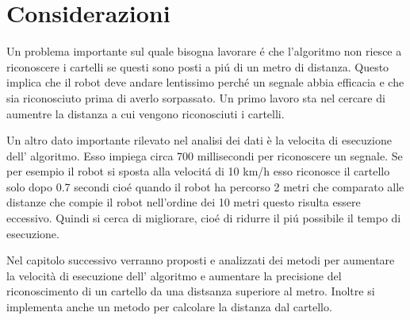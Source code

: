 \section{Considerazioni}

	Un problema importante sul quale bisogna lavorare \'e che l'algoritmo non riesce a riconoscere i cartelli se questi sono posti a pi\'u di un metro di distanza. Questo implica che il robot deve andare lentissimo perch\'e un segnale abbia efficacia e che sia riconosciuto prima di averlo sorpassato. Un primo lavoro sta nel cercare di aumentre la distanza a cui vengono riconosciuti i cartelli.

	Un altro dato importante rilevato nel analisi dei dati è la velocita di esecuzione dell' algoritmo. Esso impiega circa 700 millisecondi per riconoscere un segnale. Se per esempio il robot si sposta alla velocit\'a di 10 km/h esso riconosce il cartello solo dopo 0.7 secondi cio\'e quando il robot ha percorso 2 metri che comparato alle distanze che compie il robot nell'ordine dei 10 metri questo risulta essere eccessivo. Quindi si cerca di migliorare, cio\'e di ridurre il pi\'u possibile il tempo di esecuzione.
	
	Nel capitolo successivo verranno proposti e analizzati dei metodi per aumentare la velocità di esecuzione dell' algoritmo e aumentare la precisione del riconoscimento di un cartello da una distsanza superiore al metro. Inoltre si implementa anche un metodo per calcolare la distanza dal cartello.

	


